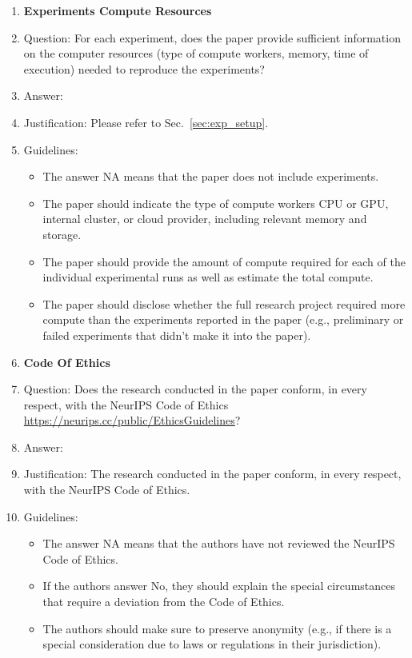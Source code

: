 \documentclass{article}
\begin{document}
\begin{enumerate}
\item {\bf Experiments Compute Resources}
    \item[] Question: For each experiment, does the paper provide sufficient information on the computer resources (type of compute workers, memory, time of execution) needed to reproduce the experiments?
    \item[] Answer: \answerYes{}{} %
    \item[] Justification: Please refer to Sec.~\ref{sec:exp_setup}.
    \item[] Guidelines:
    \begin{itemize}
        \item The answer NA means that the paper does not include experiments.
        \item The paper should indicate the type of compute workers CPU or GPU, internal cluster, or cloud provider, including relevant memory and storage.
        \item The paper should provide the amount of compute required for each of the individual experimental runs as well as estimate the total compute. 
        \item The paper should disclose whether the full research project required more compute than the experiments reported in the paper (e.g., preliminary or failed experiments that didn't make it into the paper). 
    \end{itemize}
    
\item {\bf Code Of Ethics}
    \item[] Question: Does the research conducted in the paper conform, in every respect, with the NeurIPS Code of Ethics \url{https://neurips.cc/public/EthicsGuidelines}?
    \item[] Answer: \answerYes{} %
    \item[] Justification: The research conducted in the paper conform, in every respect, with the NeurIPS Code of Ethics.
    \item[] Guidelines:
    \begin{itemize}
        \item The answer NA means that the authors have not reviewed the NeurIPS Code of Ethics.
        \item If the authors answer No, they should explain the special circumstances that require a deviation from the Code of Ethics.
        \item The authors should make sure to preserve anonymity (e.g., if there is a special consideration due to laws or regulations in their jurisdiction).
    \end{itemize}



\end{enumerate}
\end{document}
